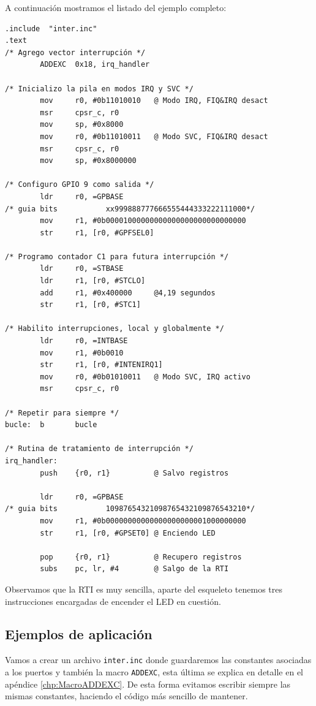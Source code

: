 A continuación mostramos el listado del ejemplo completo:

\begin{lstlisting}[caption={inter1.s},label={lst:codigoPract5_1}]
        .include  "inter.inc"
.text
/* Agrego vector interrupción */
        ADDEXC  0x18, irq_handler

/* Inicializo la pila en modos IRQ y SVC */
        mov     r0, #0b11010010   @ Modo IRQ, FIQ&IRQ desact
        msr     cpsr_c, r0
        mov     sp, #0x8000
        mov     r0, #0b11010011   @ Modo SVC, FIQ&IRQ desact
        msr     cpsr_c, r0
        mov     sp, #0x8000000

/* Configuro GPIO 9 como salida */
        ldr     r0, =GPBASE
/* guia bits           xx999888777666555444333222111000*/
        mov     r1, #0b00001000000000000000000000000000
        str     r1, [r0, #GPFSEL0]

/* Programo contador C1 para futura interrupción */
        ldr     r0, =STBASE
        ldr     r1, [r0, #STCLO]
        add     r1, #0x400000     @4,19 segundos
        str     r1, [r0, #STC1]

/* Habilito interrupciones, local y globalmente */
        ldr     r0, =INTBASE
        mov     r1, #0b0010
        str     r1, [r0, #INTENIRQ1]
        mov     r0, #0b01010011   @ Modo SVC, IRQ activo
        msr     cpsr_c, r0

/* Repetir para siempre */
bucle:  b       bucle

/* Rutina de tratamiento de interrupción */
irq_handler:
        push    {r0, r1}          @ Salvo registros

        ldr     r0, =GPBASE
/* guia bits           10987654321098765432109876543210*/
        mov     r1, #0b00000000000000000000001000000000
        str     r1, [r0, #GPSET0] @ Enciendo LED

        pop     {r0, r1}          @ Recupero registros
        subs    pc, lr, #4        @ Salgo de la RTI
\end{lstlisting}

Observamos que la RTI es muy sencilla, aparte del esqueleto tenemos tres instrucciones
encargadas de encender el LED en cuestión.

\subsection{Ejemplos de aplicación}

Vamos a crear un archivo {\tt inter.inc} donde guardaremos las constantes
asociadas a los puertos y también la macro {\tt ADDEXC}, esta última
se explica en detalle en el apéndice \ref{chp:MacroADDEXC}. De esta forma evitamos escribir
siempre las mismas constantes, haciendo el código más sencillo de mantener.

